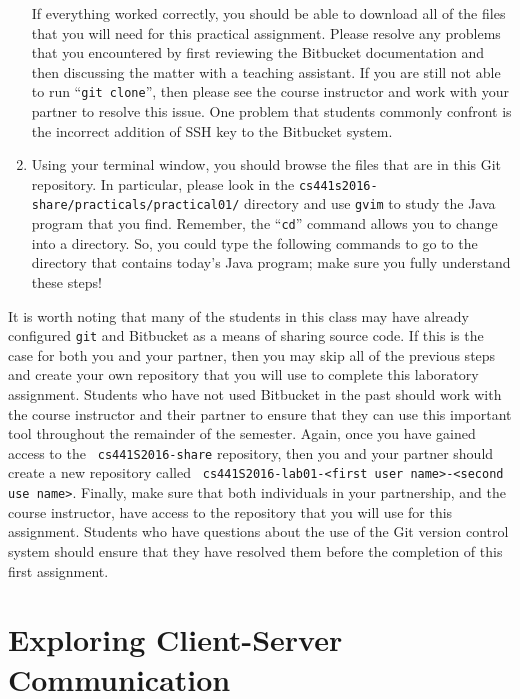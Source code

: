 \begin{enumerate}
    If everything worked correctly, you should be able to download all of the files that you will need for this
    practical assignment. Please resolve any problems that you encountered by first reviewing the Bitbucket
    documentation and then discussing the matter with a teaching assistant.  If you are still not able to run ``{\tt git
      clone}'', then please see the course instructor and work with your partner to resolve this issue. One problem that
      students commonly confront is the incorrect addition of SSH key to the Bitbucket system.

  \item Using your terminal window, you should browse the files that are in this Git repository.  In particular, please
    look in the {\tt cs441s2016-share/practicals/practical01/} directory and use {\tt gvim} to study the Java program that
    you find.  Remember, the ``{\tt cd}'' command allows you to change into a directory. So, you could type the following
    commands to go to the directory that contains today's Java program; make sure you fully understand these steps!

  \end{enumerate}

  It is worth noting that many of the students in this class may have already configured {\tt git} and Bitbucket as a
  means of sharing source code. If this is the case for both you and your partner, then you may skip all of the previous
  steps and create your own repository that you will use to complete this laboratory assignment. Students who have not
  used Bitbucket in the past should work with the course instructor and their partner to ensure that they can use this
  important tool throughout the remainder of the semester. Again, once you have gained access to the {\tt
    cs441S2016-share} repository, then you and your partner should create a new repository called {\tt
  cs441S2016-lab01-<first user name>-<second use name>}. Finally, make sure that both individuals in your partnership, and
  the course instructor, have access to the repository that you will use for this assignment. Students who have questions
  about the use of the Git version control system should ensure that they have resolved them before the completion of this
  first assignment.

\section*{Exploring Client-Server Communication}



